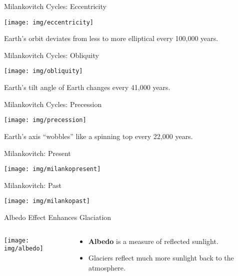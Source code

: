 \documentclass[xcolor=svgnames]{beamer}
\begin{document}
\begin{frame}{Milankovitch Cycles: Eccentricity}
	\begin{center}
		\texttt{[image: img/eccentricity]}
	\end{center}
	\begin{block}{}
		Earth's orbit deviates from less to more elliptical every 100,000 years.
	\end{block}
\end{frame}

\begin{frame}{Milankovitch Cycles: Obliquity}
	\begin{center}
		\texttt{[image: img/obliquity]}
	\end{center}
	\begin{block}{}
		Earth's tilt angle of Earth changes every 41,000 years.
	\end{block}
\end{frame}

\begin{frame}{Milankovitch Cycles: Precession}
	\begin{center}
		\texttt{[image: img/precession]}
	\end{center}
	\begin{block}{}
		Earth's axis ``wobbles'' like a spinning top every 22,000 years.
	\end{block}
\end{frame}

\begin{frame}{Milankovitch: Present}
	\begin{center}
		\texttt{[image: img/milankopresent]}
	\end{center}
\end{frame}

\begin{frame}{Milankovitch: Past}
	\begin{center}
		\texttt{[image: img/milankopast]}
	\end{center}
\end{frame}

\begin{frame}{Albedo Effect Enhances Glaciation}
	\begin{columns}[T]
		\begin{column}{0.5\textwidth}
			\begin{center}
				\texttt{[image: img/albedo]}
			\end{center}
		\end{column}
		\begin{column}{0.45\textwidth}
			\begin{itemize}
				\item	\textcolor{myBlue}{\textbf{Albedo}} is a measure of reflected sunlight. 
				\item Glaciers reflect much more sunlight back to the atmosphere. 
			\end{itemize}
		\end{column}
	\end{columns}
\end{frame}
\end{document}
